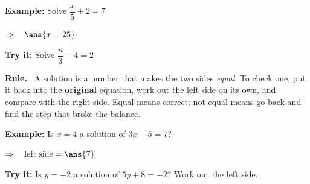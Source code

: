 \documentclass[12pt]{article}
\begin{document}
\begin{examplebox}
\textbf{Example:} \quad Solve $\dfrac{x}{5} + 2 = 7$


$\Rightarrow\quad \ans{x = 25}$
\end{examplebox}

\begin{tryitbox}
\textbf{Try it:} \quad Solve $\dfrac{n}{3} - 4 = 2$\\[2pt]
\end{tryitbox}


\begin{formulabox}
\textbf{Rule.} \ A solution is a number that makes the two sides \emph{equal}. To check one, put it back into the \textbf{original} equation, work out the left side on its own, and compare with the right side. Equal means correct; not equal means go back and find the step that broke the balance.
\end{formulabox}

\begin{examplebox}
\textbf{Example:} \quad Is $x = 4$ a solution of $3x - 5 = 7$?


$\Rightarrow\quad \text{left side} = \ans{7}$
\end{examplebox}

\begin{tryitbox}
\textbf{Try it:} \quad Is $y = -2$ a solution of $5y + 8 = -2$? Work out the left side.\\[2pt]
\end{tryitbox}
\end{document}
